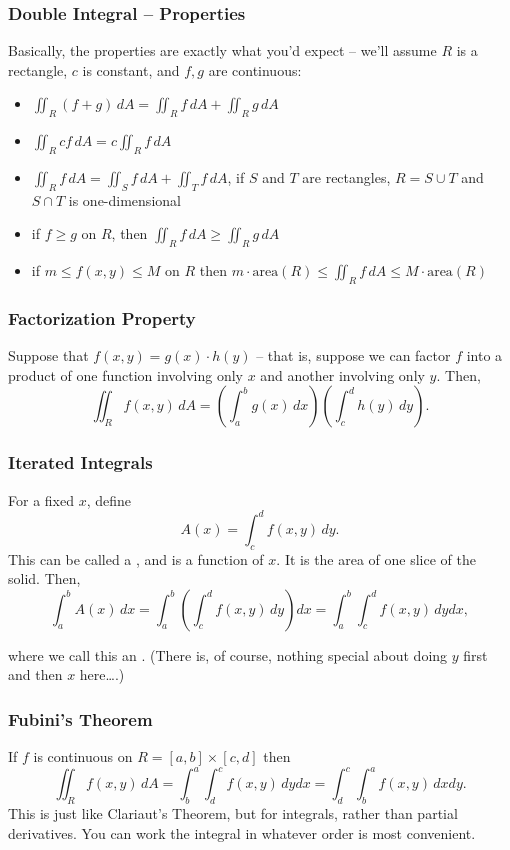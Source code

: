 \subsubsection{Double Integral – Properties}
Basically, the properties are exactly what you’d expect – we’ll assume \(R\) is a rectangle, \(c\) is constant, and \(f, g\) are continuous:
\begin{itemize}
    \item \(\iint_R (f + g) \, dA = \iint_R f \, dA + \iint_R g \, dA\)
    \item \(\iint_R cf \, dA = c \iint_R f \, dA\)
    \item \(\iint_R f \, dA = \iint_S f \, dA + \iint_T f \, dA\), if \(S\) and \(T\) are rectangles, \(R = S \cup T\) and \(S \cap T\) is one-dimensional
    \item if \(f \geq g\) on \(R\), then \(\iint_R f \, dA \geq \iint_R g \, dA\)
    \item if \(m \leq f(x, y) \leq M\) on \(R\) then \(m \cdot \text{area}(R) \leq \iint_R f \, dA \leq M \cdot \text{area}(R)\)
\end{itemize}
\subsubsection{Factorization Property}  
Suppose that \(f(x, y) = g(x) \cdot h(y)\) – that is, suppose we can factor \(f\) into a product of one function involving only \(x\) and another involving only \(y\). Then,
\[
\iint_R f(x, y) \, dA = \left( \int_a^b g(x) \, dx \right) \left( \int_c^d h(y) \, dy \right).
\]
\subsubsection{Iterated Integrals}
For a fixed \(x\), define
\[
A(x) = \int_c^d f(x, y) \, dy.
\]
This can be called a , and is a function of \(x\). It is the area of one slice of the solid. Then,
\[
\int_a^b A(x) \, dx = \int_a^b \left( \int_c^d f(x, y) \, dy \right) dx = \int_a^b \int_c^d f(x, y) \, dy dx,
\]

where we call this an . (There is, of course, nothing special about doing \(y\) first and then \(x\) here\ldots.)

\subsubsection{Fubini’s Theorem}

If \(f\) is continuous on \(R = [a, b] \times [c, d]\) then
\[
\iint_R f(x, y) \, dA = \int_b^a \int_d^c f(x, y) \, dy dx = \int_d^c \int_b^a f(x, y) \, dx dy.
\]
This is just like Clariaut’s Theorem, but for integrals, rather than partial derivatives. You can work the integral in whatever order is most convenient.
